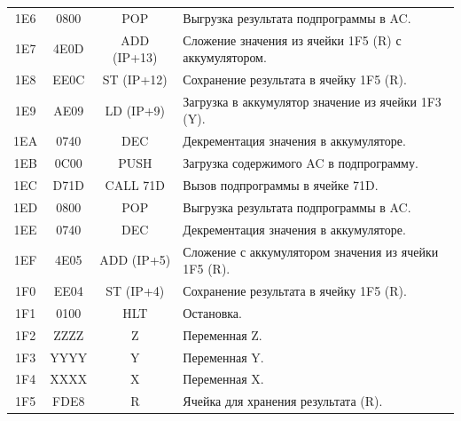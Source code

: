 \begin{center}
\begin{tabular}{|c|c|c|l|}
        1E6                   & 0800                  & POP                & Выгрузка результата подпрограммы в AC.               \\
        1E7                   & 4E0D                  & ADD (IP+13)        & Сложение значения из ячейки 1F5 (R) с аккумулятором. \\
        1E8                   & EE0C                  & ST (IP+12)         & Сохранение результата в ячейку 1F5 (R).              \\
        1E9                   & AE09                  & LD (IP+9)          & Загрузка в аккумулятор значение из ячейки 1F3 (Y).   \\
        1EA                   & 0740                  & DEC                & Декрементация значения в аккумуляторе.               \\
        1EB                   & 0C00                  & PUSH               & Загрузка содержимого AC в подпрограмму.              \\
        1EC                   & D71D                  & CALL 71D           & Вызов подпрограммы в ячейке 71D.                     \\
        1ED                   & 0800                  & POP                & Выгрузка результата подпрограммы в AC.               \\
        1EE                   & 0740                  & DEC                & Декрементация значения в аккумуляторе.               \\
        1EF                   & 4E05                  & ADD (IP+5)         & Сложение с аккумулятором значения из ячейки 1F5 (R). \\
        1F0                   & EE04                  & ST (IP+4)          & Сохранение результата в ячейку 1F5 (R).              \\
        1F1                   & 0100                  & HLT                & Остановка.                                           \\
        \hline
        1F2                   & ZZZZ                  & Z                  & Переменная Z.                                        \\
        1F3                   & YYYY                  & Y                  & Переменная Y.                                        \\
        1F4                   & XXXX                  & X                  & Переменная X.                                        \\
        1F5                   & FDE8                  & R                  & Ячейка для хранения результата (R).                  \\
        \hline
    \end{tabular}
\end{center}

